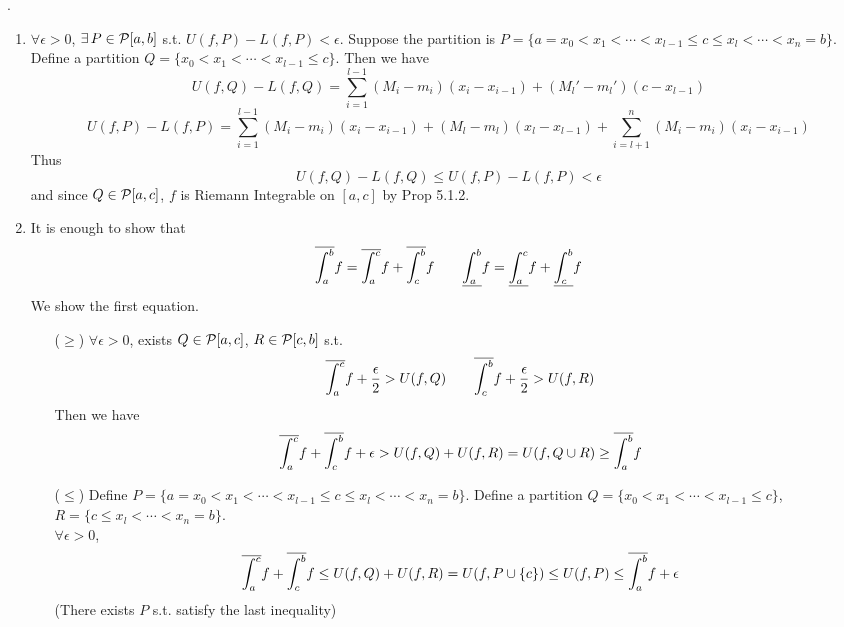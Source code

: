\pf.
\begin{enumerate}
	\item $\forall\epsilon > 0$, $\exists \,P\in \mathcal{P}[a, b]$ s.t. $U(f, P)-L(f, P) <\epsilon$. Suppose the partition is $P = \{a = x_0 < x_1 < \cdots < x_{l-1} \leq c \leq x_l < \cdots < x_n =b\}$. Define a partition $Q = \{x_0 < x_1 < \cdots < x_{l-1} \leq c\}$. Then we have
	$$U(f, Q) - L(f, Q) = \sum_{i=1}^{l-1}(M_i-m_i)(x_i-x_{i-1}) + (M_l'-m_l')(c - x_{l-1})$$
	$$ U(f, P) - L(f, P) =  \sum_{i=1}^{l-1}(M_i-m_i)(x_i-x_{i-1}) + (M_l-m_l)(x_l - x_{l-1}) + \sum_{i=l+1}^n (M_i-m_i)(x_i - x_{i-1})$$
	Thus
	$$U(f, Q) - L(f, Q) \leq U(f, P) - L(f, P) < \epsilon$$
	and since $Q\in \mathcal{P}[a, c]$, $f$ is Riemann Integrable on $[a, c]$ by Prop 5.1.2.
	\item It is enough to show that $$\overline{\int_a^b} f = \overline{\int_a^c} f + \overline{\int_c^b} f \qquad \underline{\int_a^b} f = \underline{\int_a^c} f + \underline{\int_c^b} f$$
	We show the first equation.
	\begin{enumerate}
		\item[($\geq$)] $\forall \epsilon > 0$, exists $Q\in \mathcal{P}[a, c]$, $R\in \mathcal{P}[c, b]$ s.t. $$\overline{\int_a^c} f + \frac{\epsilon}{2} > U(f, Q)\qquad \overline{\int_c^b} f + \frac{\epsilon}{2} > U(f, R)$$
		Then we have 
		$$\overline{\int_a^c} f + \overline{\int_c^b} f + \epsilon > U(f, Q) + U(f, R) = U(f, Q\cup R) \geq \overline{\int_a^b} f$$
		\item[($\leq$)] Define $P = \{a = x_0 < x_1 < \cdots < x_{l-1} \leq c \leq x_l < \cdots < x_n =b\}$. Define a partition $Q = \{x_0 < x_1 < \cdots < x_{l-1} \leq c\}$, $R = \{c\le x_l < \cdots < x_n = b\}$.\\
		$\forall\epsilon > 0$,
		$$\overline{\int_a^c} f + \overline{\int_c^b} f \leq U(f, Q) + U(f, R) = U(f, P\cup \{c\}) \leq U(f, P)\leq \overline{\int_a^b} f +\epsilon$$
		(There exists $P$ s.t. satisfy the last inequality)
	\end{enumerate}
\end{enumerate}
\pagebreak